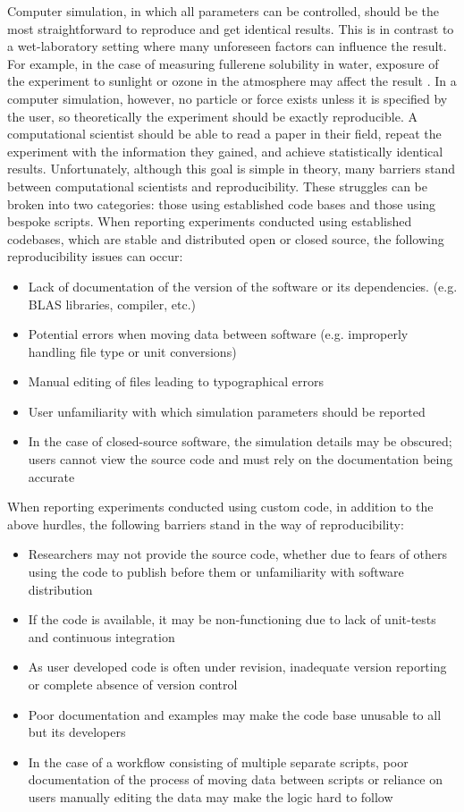 Computer simulation, in which all parameters can be controlled, should be the most straightforward to reproduce and get identical results. 
This is in contrast to a wet-laboratory setting where many unforeseen factors can influence the result.
For example, in the case of measuring fullerene solubility in water, exposure of the experiment to sunlight or ozone in the atmosphere may affect the result \cite{Isaacson2009}.
In a computer simulation, however, no particle or force exists unless it is specified by the user, so theoretically the experiment should be exactly reproducible.
A computational scientist should be able to read a paper in their field, repeat the experiment with the information they gained, and achieve statistically identical results.
Unfortunately, although this goal is simple in theory, many barriers stand between computational scientists and reproducibility.
These struggles can be broken into two categories: those using established code bases and those using bespoke scripts.
When reporting experiments conducted using established codebases, which are stable and distributed open or closed source, the following reproducibility issues can occur:
\begin{itemize}
    \item Lack of documentation of the version of the software or its dependencies. (e.g. BLAS libraries, compiler, etc.)
    \item Potential errors when moving data between software (e.g. improperly handling file type or unit conversions)
    \item Manual editing of files leading to typographical errors
    \item User unfamiliarity with which simulation parameters should be reported
    \item In the case of closed-source software, the simulation details may be obscured; users cannot view the source code and must rely on the documentation being accurate
\end{itemize}
When reporting experiments conducted using custom code, in addition to the above hurdles, the following barriers stand in the way of reproducibility:
\begin{itemize}
    \item Researchers may not provide the source code, whether due to fears of others using the code to publish before them or unfamiliarity with software distribution
    \item If the code is available, it may be non-functioning due to lack of unit-tests and continuous integration
    \item As user developed code is often under revision, inadequate version reporting or complete absence of version control
    \item Poor documentation and examples may make the code base unusable to all but its developers
    \item In the case of a workflow consisting of multiple separate scripts, poor documentation of the process of moving data between scripts or reliance on users manually editing the data may make the logic hard to follow
\end{itemize}
